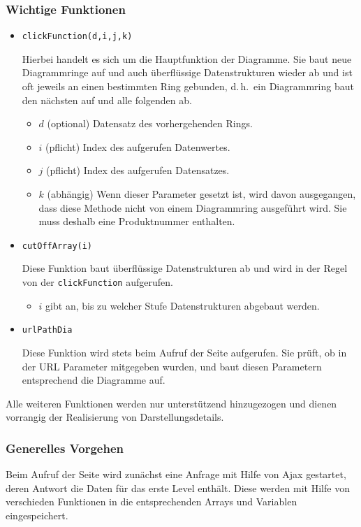 \documentclass[a4paper,11pt,twoside]{article}
\begin{document}
\subsubsection{Wichtige Funktionen}
\begin{itemize}
\item \texttt{clickFunction(d,i,j,k)} 

  Hierbei handelt es sich um die Hauptfunktion der Diagramme. Sie baut neue
  Diagrammringe auf und auch überflüssige Datenstrukturen wieder ab und ist
  oft jeweils an einen bestimmten Ring gebunden, d.\,h.\ ein Diagrammring baut
  den nächsten auf und alle folgenden ab.
  \begin{itemize}
  \item $d$ (optional) Datensatz des vorhergehenden Rings.
  \item $i$ (pflicht) Index des aufgerufen Datenwertes.
  \item $j$ (pflicht) Index des aufgerufen Datensatzes.
  \item $k$ (abhängig) Wenn dieser Parameter gesetzt ist, wird davon
    ausgegangen, dass diese Methode nicht von einem Diagrammring ausgeführt
    wird. Sie muss deshalb eine Produktnummer enthalten.
  \end{itemize}
\item \texttt{cutOffArray(i)} 

  Diese Funktion baut überflüssige Datenstrukturen ab und wird in der Regel
  von der \texttt{clickFunction} aufgerufen.
  \begin{itemize}
  \item $i$ gibt an, bis zu welcher Stufe Datenstrukturen abgebaut werden.
  \end{itemize}
\item \texttt{urlPathDia} 

  Diese Funktion wird stets beim Aufruf der Seite aufgerufen.  Sie prüft, ob
  in der URL Parameter mitgegeben wurden, und baut diesen Parametern
  entsprechend die Diagramme auf.
\end{itemize}
Alle weiteren Funktionen werden nur unterstützend hinzugezogen und dienen
vorrangig der Realisierung von Darstellungsdetails.

\subsubsection{Generelles Vorgehen}
Beim Aufruf der Seite wird zunächst eine Anfrage mit Hilfe von Ajax gestartet,
deren Antwort die Daten für das erste Level enthält. Diese werden mit Hilfe
von verschieden Funktionen in die entsprechenden Arrays und Variablen
eingespeichert. 
\end{document}
